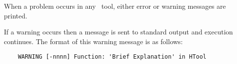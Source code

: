 %
%


When a problem occurs in any \HTK\ tool, either
error
or warning messages are printed.  

If a warning occurs then a message is sent to standard output and
execution continues. The format of this warning message is as follows:
\begin{verbatim}
    WARNING [-nnnn] Function: 'Brief Explanation' in HTool
\end{verbatim}

